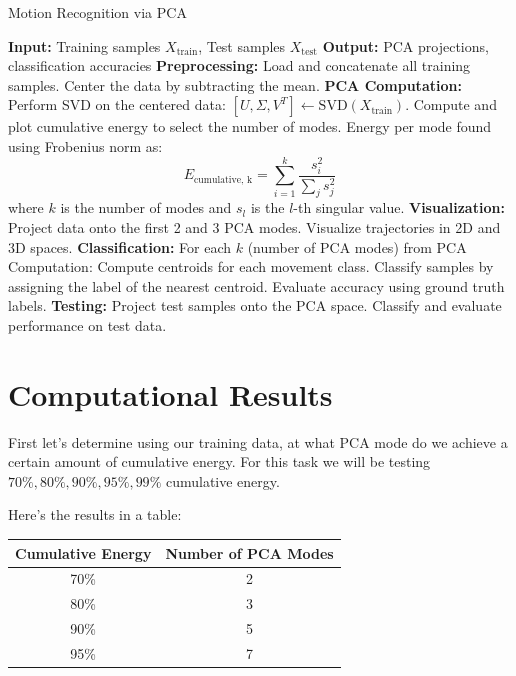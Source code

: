 \documentclass[11pt]{amsart}
\begin{document}
\begin{algorithm}
    \caption{Motion Recognition via PCA}
    \begin{algorithmic}[1]
    \State \textbf{Input:} Training samples $X_{\text{train}}$, Test samples $X_{\text{test}}$
    \State \textbf{Output:} PCA projections, classification accuracies
    \medskip
    \State \textbf{Preprocessing:}
        \State \quad Load and concatenate all training samples.
        \State \quad Center the data by subtracting the mean.
    \medskip
    \State \textbf{PCA Computation:}
        \State \quad Perform SVD on the centered data: $[U, \Sigma, V^T] \gets \text{SVD}(X_{\text{train}})$.
        \State \quad Compute and plot cumulative energy to select the number of modes.
        \State \quad Energy per mode found using Frobenius norm as: \[E_{\text{cumulative, k}} = \sum_{i = 1}^{k} \frac{s_i^2}{\sum_{j} s_j^2}\]
        where $k$ is the number of modes and $s_l$ is the $l$-th singular value.
    \medskip
    \State \textbf{Visualization:}
        \State \quad Project data onto the first 2 and 3 PCA modes.
        \State \quad Visualize trajectories in 2D and 3D spaces.
    \medskip
    \State \textbf{Classification:}
        \State \quad For each $k$ (number of PCA modes) from PCA Computation:
            \State \quad \quad Compute centroids for each movement class.
            \State \quad \quad Classify samples by assigning the label of the nearest centroid.
            \State \quad \quad Evaluate accuracy using ground truth labels.
    \medskip
    \State \textbf{Testing:}
        \State \quad Project test samples onto the PCA space.
        \State \quad Classify and evaluate performance on test data.
    \end{algorithmic}
    \end{algorithm}

\section{Computational Results}\label{sec:Results}

First let's determine using our training data, at what PCA mode do we achieve a certain amount of cumulative energy. For this task we will be testing $70\%, 80\%, 90\%, 95\%, 99\%$ cumulative energy.

Here's the results in a table:

\begin{table}[h]
    \centering
    \begin{tabular}{|c|c|}
    \hline
    \textbf{Cumulative Energy} & \textbf{Number of PCA Modes} \\ \hline
    70\%                       & 2                            \\ \hline
    80\%                       & 3                            \\ \hline
    90\%                       & 5                            \\ \hline
    95\%                       & 7                           \\ \hline
    \end{tabular}
\end{table}
\end{document}
